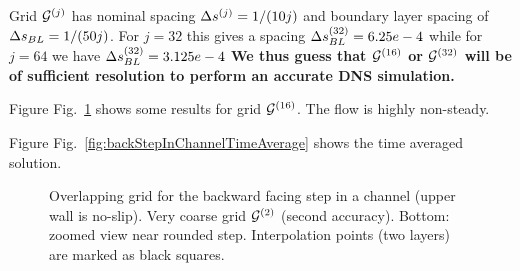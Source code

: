 \documentclass[11pt]{article}
\begin{document}
Grid ${\mathcal G}^{(j)}$ has nominal spacing $\Delta s^{(j)}=1/(10 j)$ and boundary layer spacing of $\Delta s_{BL}=1/(50 j)$. 
For $j=32$ this gives a spacing $\Delta s_{BL}^{(32)} = 6.25e-4$ while for $j=64$  we have $\Delta s_{BL}^{(32)} = 3.125e-4$
{\bf We thus guess that ${\mathcal G}^{(16)}$ or ${\mathcal G}^{(32)}$ will be of sufficient resolution to perform an accurate DNS simulation.}

\bigskip
Figure Fig.~\ref{fig:backStepInChannelGrid} shows some results for grid ${\mathcal G}^{(16)}$. The flow is highly non-steady.

Figure Fig.~\ref{fig:backStepInChannelTimeAverage} shows the time averaged solution.


{
\begin{figure}[hbt]
\newcommand{\figWidth}{16cm}
\newcommand{\trimfig}[2]{\trimFigb{#1}{#2}{0.01}{.01}{.275}{.275}}
\newcommand{\figWidtha}{5.5cm}
\newcommand{\trimfiga}[2]{\trimFigb{#1}{#2}{0.0}{.0}{.0}{.0}}
\begin{center}\small
\caption{
Overlapping grid for the backward facing step in a channel (upper wall is no-slip). Very coarse grid ${\mathcal G}^{(2)}$ (second accuracy). Bottom: zoomed view near rounded step.
Interpolation points (two layers) are marked as black squares.
}
\label{fig:backStepInChannelGrid}
\end{center}
\end{figure}
}
\end{document}
